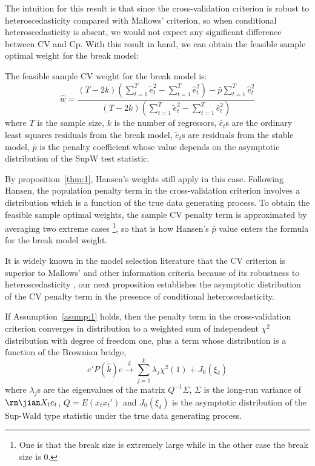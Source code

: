 The intuition for this result is that since the cross-validation criterion is robust to heteroscedasticity compared with Mallows' criterion, so when conditional heteroscedasticity is absent, we would not expect any significant difference between CV and Cp. With this result in hand, we can obtain the feasible sample optimal weight for the break model: 

\begin{corollary} \label{corollary:1}
The feasible sample CV weight for the break model is:
    \begin{equation}
    \hat{w} = \frac{(T - 2k)(\sum_{t=1}^{T}\tilde{e}_{t}^{2} - \sum_{t=1}^{T}\hat{e}_{t}^{2}) - \bar{p}\sum_{t=1}^{T}\hat{e}_{t}^{2}}{(T - 2k)(\sum_{t=1}^{T}\tilde{e}_{t}^{2} - \sum_{t=1}^{T}\hat{e}_{t}^{2})}
    \end{equation}
where $T$ is the sample size, $k$ is the number of regressors, $\hat{e}_t$s are the ordinary least squares residuals from the break model, $\tilde{e}_t$s are residuals from the stable model, $\bar{p}$ is the penalty coefficient whose value depends on the asymptotic distribution of the SupW test statistic.
\end{corollary}

By proposition~\ref{thm:1}, Hansen's weights \cite{hansen2009averaging} still apply in this case. Following Hansen, the population penalty term in the cross-validation criterion involves a distribution which is a function of the true data generating process. To obtain the feasible sample optimal weights, the sample CV penalty term is approximated by averaging two extreme cases \footnote{One is that the break size is extremely large while in the other case the break size is $0$.}, so that is how Hansen's $\bar{p}$ value enters the formula for the break model weight.

It is widely known in the model selection literature that the CV criterion is superior to Mallows' and other information criteria because of its robustness to heteroscedasticity \cite{andrews_JE1991}, our next proposition establishes the asymptotic distribution of the CV penalty term in the presence of conditional heteroscedasticity.
\begin{proposition} \label{thm:2}
If Assumption~\ref{asump:1} holds, then the penalty term in the cross-validation criterion converges in distribution to a weighted sum of independent $\chi^2$ distribution with degree of freedom one, plus a term whose distribution is a function of the Brownian bridge,
    \begin{equation} \label{eq:4}
    	e'P(\hat{k})e \stackrel{d}{\rightarrow} \sum_{j=1}^{k} \lambda_j \chi^2(1) + J_0(\xi_{\delta})
    \end{equation}
where $\lambda_j$s are the eigenvalues of the matrix $Q^{-1}\Sigma$, $\Sigma$ is the long-run variance of $\rn\jian X_t e_t$, $Q = E(x_t x_t')$ and $J_0(\xi_{\delta})$ is the asymptotic distribution of the Sup-Wald type statistic under the true data generating process.
\end{proposition}


